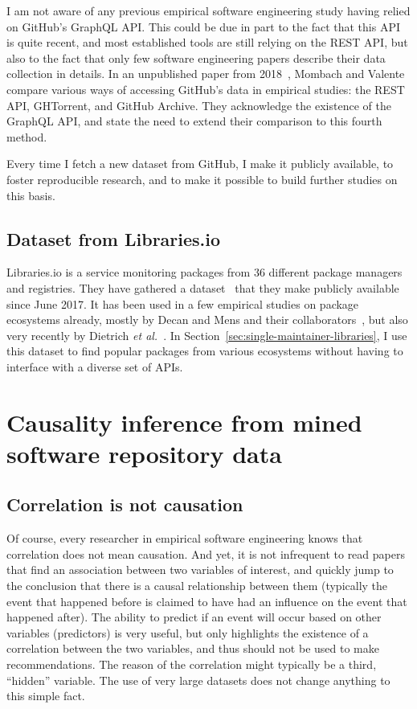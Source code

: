 I am not aware of any previous empirical software engineering study having relied on GitHub's GraphQL API.
This could be due in part to the fact that this API is quite recent, and most established tools are still relying on the REST API, but also to the fact that only few software engineering papers describe their data collection in details.
In an unpublished paper from 2018~\cite{mombach2018github}, Mombach and Valente compare various ways of accessing GitHub's data in empirical studies: the REST API, GHTorrent, and GitHub Archive.
They acknowledge the existence of the GraphQL API, and state the need to extend their comparison to this fourth method.

Every time I fetch a new dataset from GitHub, I make it publicly available, to foster reproducible research, and to make it possible to build further studies on this basis.

\subsection{Dataset from Libraries.io}

\label{sec:libraries-io}

Libraries.io is a service monitoring packages from 36 different package managers and registries.
They have gathered a dataset~\cite{andrew_nesbitt_2017_808273} that they make publicly available since June 2017.
It has been used in a few empirical studies on package ecosystems already, mostly by Decan and Mens and their collaborators~\cite{decan2018evolution, decan2018impact, constantinou2018breaking, decan2019empirical, zerouali2019diversity}, but also very recently by Dietrich \emph{et al.}~\cite{dietrich2019dependency}.
In Section~\ref{sec:single-maintainer-libraries}, I use this dataset to find popular packages from various ecosystems without having to interface with a diverse set of APIs.

\section{Causality inference from mined software repository data}

\subsection{Correlation is not causation}

Of course, every researcher in empirical software engineering knows that correlation does not mean causation.
And yet, it is not infrequent to read papers that find an association between two variables of interest, and quickly jump to the conclusion that there is a causal relationship between them (typically the event that happened before is claimed to have had an influence on the event that happened after).
The ability to predict if an event will occur based on other variables (predictors) is very useful, but only highlights the existence of a correlation between the two variables, and thus should not be used to make recommendations.
The reason of the correlation might typically be a third, ``hidden'' variable.
The use of very large datasets does not change anything to this simple fact.

